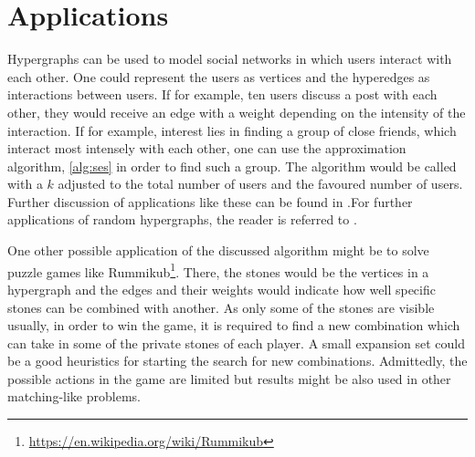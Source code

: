 \chapter{Applications}\label{chapter:applications}
Hypergraphs can be used to model social networks in which users interact with each other. One could represent the users as vertices and the hyperedges as interactions between users. If for example, ten users discuss a post with each other, they would receive an edge with a weight depending on the intensity of the interaction. If for example, interest lies in finding a group of close friends, which interact most intensely with each other, one can use the approximation algorithm, \cref{alg:ses} in order to find such a group. The algorithm would be called with a $k$ adjusted to the total number of users and the favoured number of users. Further discussion of applications like these can be found in \cite{zhang2010hypergraph}.For further applications of random hypergraphs, the reader is referred to \cite{ghoshal2009random}.

One other possible application of the discussed algorithm might be to solve puzzle games like Rummikub\footnote{\href{https://en.wikipedia.org/wiki/Rummikub}{https://en.wikipedia.org/wiki/Rummikub}}. There, the stones would be the vertices in a hypergraph and the edges and their weights would indicate how well specific stones can be combined with another. As only some of the stones are visible usually, in order to win the game, it is required to find a new combination which can take in some of the private stones of each player. A small expansion set could be a good heuristics for starting the search for new combinations. Admittedly, the possible actions in the game are limited but results might be also used in other matching-like problems.


